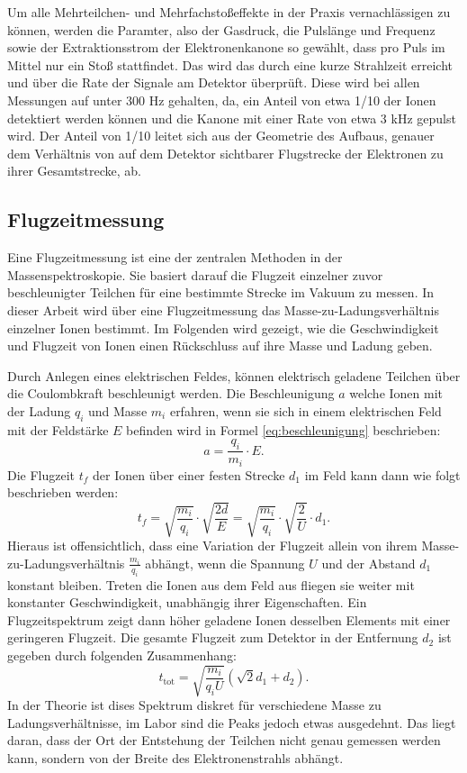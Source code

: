 Um alle Mehrteilchen- und Mehrfachstoßeffekte in der Praxis vernachlässigen zu können, werden die Paramter, also der Gasdruck, die Pulslänge und Frequenz sowie der Extraktionsstrom der Elektronenkanone so gewählt, dass pro Puls im Mittel nur ein Stoß stattfindet. Das wird das durch eine kurze Strahlzeit erreicht und über die Rate der Signale am Detektor überprüft. Diese wird bei allen Messungen auf unter 300 Hz gehalten, da, ein Anteil von etwa 1/10 der Ionen detektiert werden können und die Kanone mit einer Rate von etwa 3 kHz gepulst wird. Der Anteil von 1/10 leitet sich aus der Geometrie des Aufbaus, genauer dem Verhältnis von auf dem Detektor sichtbarer Flugstrecke der Elektronen zu ihrer Gesamtstrecke, ab.

\subsection{Flugzeitmessung}
Eine Flugzeitmessung ist eine der zentralen Methoden in der Massenspektroskopie. Sie basiert darauf die Flugzeit einzelner zuvor beschleunigter Teilchen für eine bestimmte Strecke im Vakuum zu messen. In dieser Arbeit wird über eine Flugzeitmessung das Masse-zu-Ladungsverhältnis einzelner Ionen bestimmt. Im Folgenden wird gezeigt, wie die Geschwindigkeit und Flugzeit von Ionen einen Rückschluss auf ihre Masse und Ladung geben.

Durch Anlegen eines elektrischen Feldes, können elektrisch geladene Teilchen über die Coulombkraft beschleunigt werden. Die Beschleunigung $a$ welche Ionen mit der Ladung $q_i$ und Masse $m_i$ erfahren, wenn sie sich in einem elektrischen Feld mit der Feldstärke $E$ befinden wird in Formel \ref{eq:beschleunigung} beschrieben: 
\begin{equation}
    \label{eq:beschleunigung}
    a = \frac{q_i}{m_i} \cdot E.
\end{equation}
Die Flugzeit $t_f$ der Ionen über einer festen Strecke $d_1$ im Feld kann dann wie folgt beschrieben werden:
\begin{equation}
    t_f = \sqrt{\frac{m_i}{q_i}} \cdot \sqrt{\frac{2d}{E}} = \sqrt{\frac{m_i}{q_i}} \cdot \sqrt{\frac{2}{U}} \cdot d_1.
\end{equation}
Hieraus ist offensichtlich, dass eine Variation der Flugzeit allein von ihrem Masse-zu-Ladungsverhältnis $\frac{m_i}{q_i}$ abhängt, wenn die Spannung $U$ und der Abstand $d_1$ konstant bleiben. Treten die Ionen aus dem Feld aus fliegen sie weiter mit konstanter Geschwindigkeit, unabhängig ihrer Eigenschaften. Ein Flugzeitspektrum zeigt dann höher geladene Ionen desselben Elements mit einer geringeren Flugzeit. Die gesamte Flugzeit zum Detektor in der Entfernung $d_2$ ist gegeben durch folgenden Zusammenhang:
\begin{equation}
    t_{\text{tot}} = \sqrt{\frac{m_i}{q_i U}} \left( \sqrt{2} d_1 + d_2 \right).
    \label{eq:time}
\end{equation}
In der Theorie ist dises Spektrum diskret für verschiedene Masse zu Ladungsverhältnisse, im Labor sind die Peaks jedoch etwas ausgedehnt. Das liegt daran, dass der Ort der Entstehung der Teilchen nicht genau gemessen werden kann, sondern von der Breite des Elektronenstrahls abhängt.

